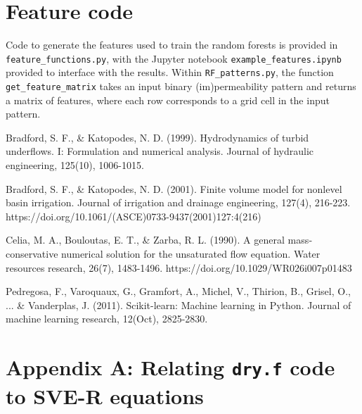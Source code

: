 \documentclass{article}
\newcommand{\code}[1]{\texttt{#1}}
\begin{document}


\section{Feature code}

Code to generate the features used to train the random forests is provided in \code{feature\_functions.py}, with the Jupyter notebook \code{example\_features.ipynb} provided to interface with the results.
Within \code{RF\_patterns.py}, the  function \code{get\_feature\_matrix} takes an input binary (im)permeability pattern and returns a matrix of features, where each row corresponds to a grid cell in the input pattern.


 \begin{thebibliography}{}
  Bradford, S. F., \& Katopodes, N. D. (1999). Hydrodynamics of turbid underflows. I: Formulation and numerical analysis. Journal of hydraulic engineering, 125(10), 1006-1015.

  Bradford, S. F., \& Katopodes, N. D. (2001). Finite volume model for nonlevel basin irrigation. Journal of irrigation and drainage engineering, 127(4), 216-223. https://doi.org/10.1061/(ASCE)0733-9437(2001)127:4(216)
 
  Celia, M. A., Bouloutas, E. T., \& Zarba, R. L. (1990). A general mass‐conservative numerical solution for the unsaturated flow equation. Water resources research, 26(7), 1483-1496.  https://doi.org/10.1029/WR026i007p01483

  Pedregosa, F., Varoquaux, G., Gramfort, A., Michel, V., Thirion, B., Grisel, O., ... \& Vanderplas, J. (2011). Scikit-learn: Machine learning in Python. Journal of machine learning research, 12(Oct), 2825-2830.
 \end{thebibliography}


\section{Appendix A: Relating \code{dry.f} code to SVE-R equations }
\end{document}
